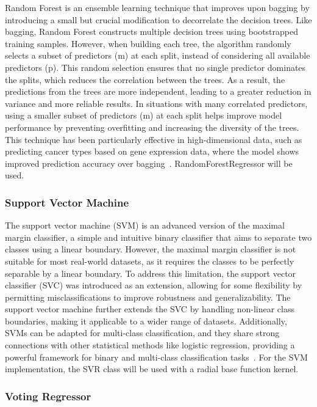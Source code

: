 Random Forest is an ensemble learning technique that improves upon bagging by introducing a small but
crucial modification to decorrelate the decision trees. Like bagging, Random Forest constructs multiple
decision trees using bootstrapped training samples. However, when building each tree, the algorithm
randomly selects a subset of predictors (m) at each split, instead of considering all available
predictors (p). This random selection ensures that no single predictor dominates the splits, which
reduces the correlation between the trees. As a result, the predictions from the trees are more
independent, leading to a greater reduction in variance and more reliable results. In situations
with many correlated predictors, using a smaller subset of predictors (m) at each split helps improve
model performance by preventing overfitting and increasing the diversity of the trees. This technique
has been particularly effective in high-dimensional data, such as predicting cancer types based on
gene expression data, where the model shows improved prediction accuracy over bagging\ \cite{James2023}.
RandomForestRegressor will be used. 

\subsubsection{Support Vector Machine}\label{subsubsec:svm}

The support vector machine (SVM) is an advanced version of the maximal margin classifier, a simple and
intuitive binary classifier that aims to separate two classes using a linear boundary. However, the
maximal margin classifier is not suitable for most real-world datasets, as it requires the classes to be
perfectly separable by a linear boundary. To address this limitation, the support vector classifier (SVC)
was introduced as an extension, allowing for some flexibility by permitting misclassifications to improve
robustness and generalizability. The support vector machine further extends the SVC by handling non-linear
class boundaries, making it applicable to a wider range of datasets. Additionally, SVMs can be adapted for
multi-class classification, and they share strong connections with other statistical methods like logistic
regression, providing a powerful framework for binary and multi-class classification tasks\ \cite{James2023}.
For the SVM implementation, the  SVR class will be used with a radial base function kernel. 

\subsubsection{Voting Regressor}\label{subsubsec:voting_regressor}

